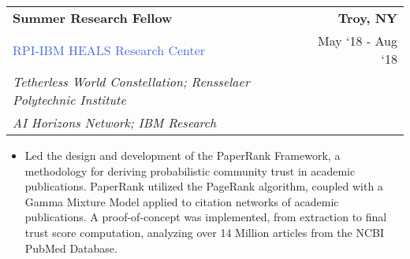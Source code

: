 \documentclass[10pt]{article}
\newcommand{\highlightcolor}{RoyalBlue}
\newcommand{\tabularxwidth}{\textwidth}
\begin{document}
    \begin{minipage}{\tabularxwidth}

        \begin{tabularx}{\tabularxwidth}{X r}
            \textbf{Summer Research Fellow} & \textbf{Troy, 
        NY} \\
            
    
    
    
    

    
        \textcolor{\highlightcolor}{RPI-IBM HEALS Research Center} & 
        
    May ‘18 - 
    Aug ‘18 \\
        
            
                \textit{Tetherless World Constellation; Rensselaer Polytechnic Institute} & \\
            
                \textit{AI Horizons Network; IBM Research} & \\
            
        
    
            
        \end{tabularx}

        \begin{itemize}[noitemsep, topsep=3pt, parsep=0pt, partopsep=0pt]
            
                \item 
    Led the design and development of the PaperRank Framework, a methodology for deriving probabilistic community trust in academic publications. PaperRank utilized the PageRank algorithm, coupled with a Gamma Mixture Model applied to citation networks of academic publications. A proof-of-concept was implemented, from extraction to final trust score computation, analyzing over 14 Million articles from the NCBI PubMed Database.
            

\end{itemize}
\end{minipage}
\end{document}
